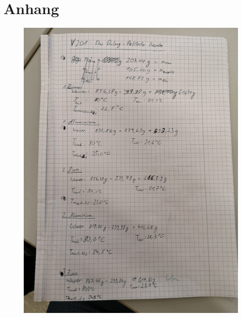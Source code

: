 \section{Anhang}
\label{sec:anhang}

\begin{figure}[htbp]
    \centering
    \includegraphics[width=\textwidth]{content/Bilder/Daten1.jpg}
\end{figure}

